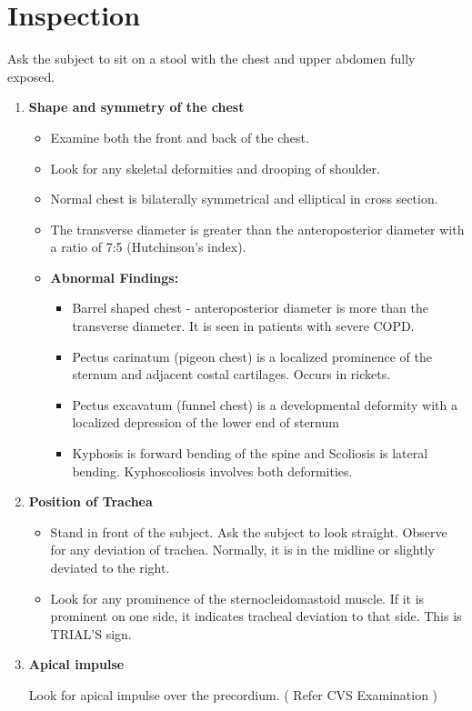 \documentclass[a4paper,12pt]{book}
\begin{document}
\section*{Inspection}
Ask the subject to sit on a stool with the chest and upper abdomen fully exposed.
\begin{enumerate}
\item{\textbf{Shape and symmetry of the chest}}
	\begin{itemize}
\item{Examine both the front and back of the chest.}
\item{Look for any skeletal deformities and drooping of shoulder.}
\item{Normal chest is bilaterally symmetrical and elliptical in cross section.}
\item{The transverse diameter is greater than the anteroposterior diameter with a ratio of 7:5  (Hutchinson’s index).}
\item[]\textbf{Abnormal Findings:}
	\begin{itemize}
\item{			Barrel shaped chest - anteroposterior diameter is more than the transverse diameter. It is seen in patients with severe COPD.}
\item{Pectus carinatum (pigeon chest) is a localized prominence of the sternum and adjacent costal cartilages. Occurs in rickets.}
\item{Pectus excavatum (funnel chest) is a developmental deformity with a localized depression of the lower end of sternum}
\item{Kyphosis is forward bending of the spine and Scoliosis is lateral bending. Kyphoscoliosis involves both deformities.}
	\end{itemize}
	\end{itemize}
\item{\textbf{Position of Trachea}}
	\begin{itemize}
\item{Stand in front of the subject. Ask the subject to look straight. Observe for any deviation of trachea. Normally, it is in the midline or slightly deviated to the right.}
\item{Look for any prominence of the sternocleidomastoid muscle. If it is prominent on one side, it indicates tracheal deviation to that side. This is TRIAL’S sign.}
	\end{itemize}
\item{\textbf{Apical impulse}\par Look for apical impulse over the precordium. ( Refer CVS Examination )}

\end{enumerate}
\end{document}

